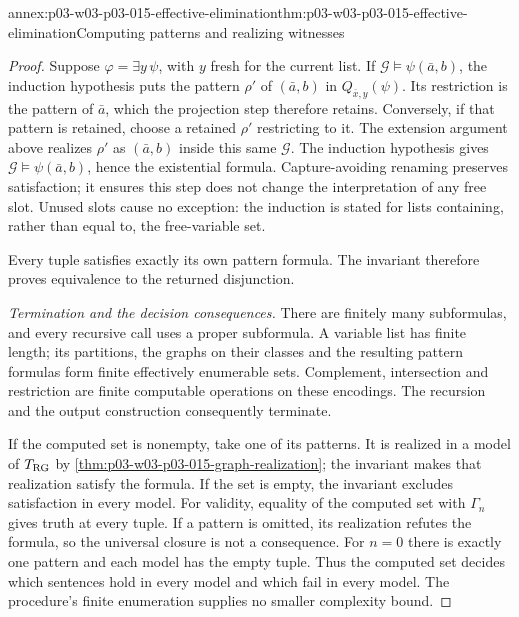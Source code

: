 \begin{annexitem}{annex:p03-w03-p03-015-effective-elimination}{thm:p03-w03-p03-015-effective-elimination}{Computing patterns and realizing witnesses}
\begin{proof}
Suppose \(\varphi=\exists y\,\psi\), with \(y\) fresh for the
current list. If \(\mathcal G\models\psi(\bar a,b)\), the induction
hypothesis puts the pattern \(\rho'\) of \((\bar a,b)\) in
\(Q_{\bar x,y}(\psi)\). Its restriction is the pattern of \(\bar a\),
which the projection step therefore retains. Conversely, if that
pattern is retained, choose a retained \(\rho'\) restricting to it.
The extension argument above realizes \(\rho'\) as \((\bar a,b)\)
inside this same \(\mathcal G\). The induction hypothesis gives
\(\mathcal G\models\psi(\bar a,b)\), hence the existential formula.
Capture-avoiding renaming preserves satisfaction; it ensures this step
does not change the interpretation of any free slot. Unused slots cause
no exception: the induction is stated for lists containing, rather than
equal to, the free-variable set.

Every tuple satisfies exactly its own pattern formula. The invariant
therefore proves equivalence to the returned disjunction.

\emph{Termination and the decision consequences.}
There are finitely many subformulas, and every recursive call uses a
proper subformula. A variable list has finite length; its partitions,
the graphs on their classes and the resulting pattern formulas form
finite effectively enumerable sets. Complement, intersection and
restriction are finite computable operations on these encodings.
The recursion and the output construction consequently terminate.

If the computed set is nonempty, take one of its patterns. It is
realized in a model of \(T_{\rm RG}\) by
\cref{thm:p03-w03-p03-015-graph-realization}; the invariant makes that
realization satisfy the formula. If the set is empty, the invariant
excludes satisfaction in every model. For validity, equality of the
computed set with \(\Gamma_n\) gives truth at every tuple. If a pattern
is omitted, its realization refutes the formula, so the universal
closure is not a consequence. For \(n=0\) there is exactly one pattern
and each model has the empty tuple. Thus the computed set decides which
sentences hold in every model and which fail in every model. The
procedure's finite enumeration supplies no smaller complexity bound.
\end{proof}
\end{annexitem}
